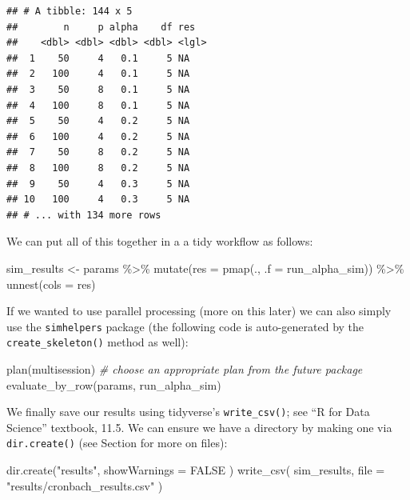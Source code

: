 \documentclass[
]{book}
\newenvironment{Shaded}{\begin{snugshade}}{\end{snugshade}}
\newcommand{\AttributeTok}[1]{\textcolor[rgb]{0.77,0.63,0.00}{#1}}
\newcommand{\CommentTok}[1]{\textcolor[rgb]{0.56,0.35,0.01}{\textit{#1}}}
\newcommand{\ConstantTok}[1]{\textcolor[rgb]{0.00,0.00,0.00}{#1}}
\newcommand{\FunctionTok}[1]{\textcolor[rgb]{0.00,0.00,0.00}{#1}}
\newcommand{\NormalTok}[1]{#1}
\newcommand{\OtherTok}[1]{\textcolor[rgb]{0.56,0.35,0.01}{#1}}
\newcommand{\SpecialCharTok}[1]{\textcolor[rgb]{0.00,0.00,0.00}{#1}}
\newcommand{\StringTok}[1]{\textcolor[rgb]{0.31,0.60,0.02}{#1}}
\begin{document}
\begin{verbatim}
## # A tibble: 144 x 5
##        n     p alpha    df res  
##    <dbl> <dbl> <dbl> <dbl> <lgl>
##  1    50     4   0.1     5 NA   
##  2   100     4   0.1     5 NA   
##  3    50     8   0.1     5 NA   
##  4   100     8   0.1     5 NA   
##  5    50     4   0.2     5 NA   
##  6   100     4   0.2     5 NA   
##  7    50     8   0.2     5 NA   
##  8   100     8   0.2     5 NA   
##  9    50     4   0.3     5 NA   
## 10   100     4   0.3     5 NA   
## # ... with 134 more rows
\end{verbatim}

We can put all of this together in a a tidy workflow as follows:

\begin{Shaded}
\begin{Highlighting}[]
\NormalTok{sim\_results }\OtherTok{\textless{}{-}} 
\NormalTok{  params }\SpecialCharTok{\%\textgreater{}\%}
  \FunctionTok{mutate}\NormalTok{(}\AttributeTok{res =} \FunctionTok{pmap}\NormalTok{(., }\AttributeTok{.f =}\NormalTok{ run\_alpha\_sim)) }\SpecialCharTok{\%\textgreater{}\%}
  \FunctionTok{unnest}\NormalTok{(}\AttributeTok{cols =}\NormalTok{ res)}
\end{Highlighting}
\end{Shaded}

If we wanted to use parallel processing (more on this later) we can also simply use the \texttt{simhelpers} package (the following code is auto-generated by the \texttt{create\_skeleton()} method as well):

\begin{Shaded}
\begin{Highlighting}[]
\FunctionTok{plan}\NormalTok{(multisession) }\CommentTok{\# choose an appropriate plan from the future package}
\FunctionTok{evaluate\_by\_row}\NormalTok{(params, run\_alpha\_sim)}
\end{Highlighting}
\end{Shaded}

We finally save our results using tidyverse's \texttt{write\_csv()}; see ``R for Data Science'' textbook, 11.5.
We can ensure we have a directory by making one via \texttt{dir.create()} (see Section \citet{saving_files} for more on files):

\begin{Shaded}
\begin{Highlighting}[]
\FunctionTok{dir.create}\NormalTok{(}\StringTok{"results"}\NormalTok{, }\AttributeTok{showWarnings =} \ConstantTok{FALSE}\NormalTok{ )}
\FunctionTok{write\_csv}\NormalTok{( sim\_results, }\AttributeTok{file =} \StringTok{"results/cronbach\_results.csv"}\NormalTok{ )}
\end{Highlighting}
\end{Shaded}
\end{document}
